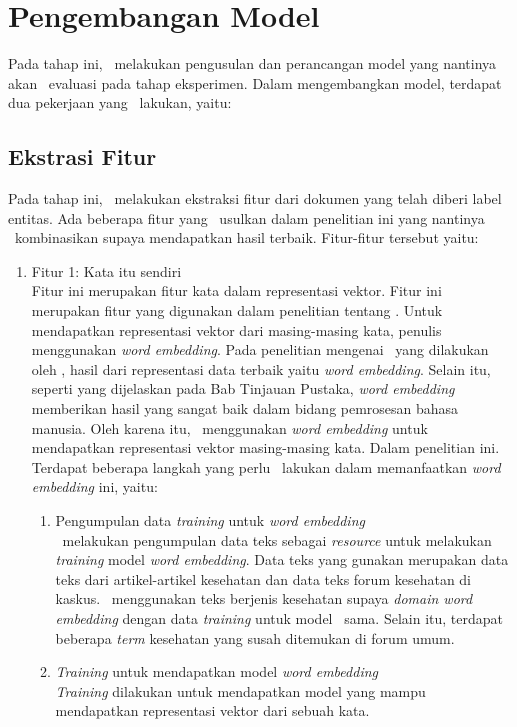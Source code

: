 \section{Pengembangan Model}
Pada tahap ini, \saya~melakukan pengusulan dan perancangan model yang nantinya akan \saya~evaluasi pada tahap eksperimen. Dalam mengembangkan model, terdapat dua pekerjaan yang \saya~lakukan, yaitu:

\subsection{Ekstrasi Fitur}
Pada tahap ini, \saya~melakukan ekstraksi fitur dari dokumen yang telah diberi label entitas. Ada beberapa fitur yang \saya~usulkan dalam penelitian ini yang nantinya \saya~kombinasikan supaya mendapatkan hasil terbaik. Fitur-fitur tersebut yaitu:
\begin{enumerate}
	\item Fitur 1: Kata itu sendiri\\
	Fitur ini merupakan fitur kata dalam representasi vektor. Fitur ini merupakan fitur yang digunakan \cite{abacha2011medical} dalam penelitian tentang \mer. Untuk mendapatkan representasi vektor dari masing-masing kata, penulis menggunakan \textit{word embedding}. Pada penelitian mengenai \mer~yang dilakukan oleh \cite{mujiono2016new}, hasil dari representasi data terbaik yaitu \textit{word embedding}. Selain itu, seperti yang dijelaskan pada Bab Tinjauan Pustaka, \textit{word embedding} memberikan hasil yang sangat baik dalam bidang pemrosesan bahasa manusia. Oleh karena itu, \saya~menggunakan \textit{word embedding} untuk mendapatkan representasi vektor masing-masing kata. Dalam penelitian ini. Terdapat beberapa langkah yang perlu \saya~lakukan dalam memanfaatkan \textit{word embedding} ini, yaitu:
	\begin{enumerate}
		\item Pengumpulan data \textit{training} untuk \textit{word embedding}\\
		\Saya~melakukan pengumpulan data teks sebagai \textit{resource} untuk melakukan \textit{training} model \textit{word embedding}. Data teks yang \saya gunakan merupakan data teks dari artikel-artikel kesehatan dan data teks forum kesehatan di kaskus. \Saya~menggunakan teks berjenis kesehatan supaya \textit{domain word embedding} dengan data \textit{training} untuk model \mer~sama. Selain itu, terdapat beberapa \textit{term} kesehatan yang susah ditemukan di forum umum.
		 
		\item \textit{Training} untuk mendapatkan model \textit{word embedding}\\
		\textit{Training} dilakukan untuk mendapatkan model yang mampu mendapatkan representasi vektor dari sebuah kata.
		

\end{enumerate}
\end{enumerate}
